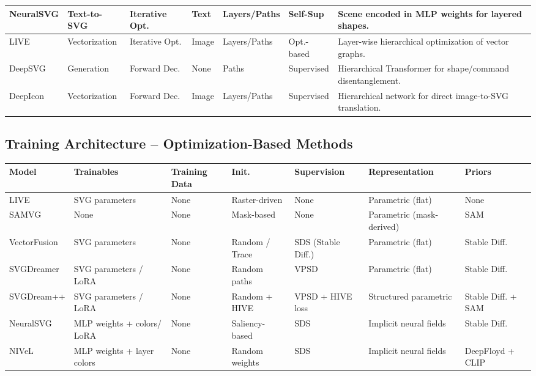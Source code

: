 \begin{landscape}
\begin{tabularx}{\linewidth}{l | l | l | l | l | l | X}
        NeuralSVG & Text-to-SVG & Iterative Opt. & Text & Layers/Paths & Self-Sup & Scene encoded in MLP weights for layered shapes. \\ \hline
        LIVE & Vectorization & Iterative Opt. & Image & Layers/Paths & Opt.-based & Layer-wise hierarchical optimization of vector graphs. \\ \hline
        DeepSVG & Generation & Forward Dec. & None & Paths & Supervised & Hierarchical Transformer for shape/command disentanglement. \\ \hline
        DeepIcon & Vectorization & Forward Dec. & Image & Layers/Paths & Supervised & Hierarchical network for direct image-to-SVG translation. \\ \hline
        \bottomrule
    \end{tabularx}
    \vfill\null
    \end{landscape}






\begin{landscape}
\thispagestyle{empty}
\centering
\small
\section*{Training Architecture – Optimization-Based Methods}

\begin{tabularx}{\linewidth}{
>{\raggedright\arraybackslash}p{2.3cm} |
>{\raggedright\arraybackslash}p{3cm} |
>{\raggedright\arraybackslash}p{2.2cm} |
>{\raggedright\arraybackslash}p{2cm} |
>{\raggedright\arraybackslash}p{2.5cm} |
>{\raggedright\arraybackslash}p{2.8cm} |
X}
\toprule
\textbf{Model} & \textbf{Trainables} & \textbf{Training Data} & \textbf{Init.} & \textbf{Supervision} & \textbf{Representation} & \textbf{Priors} \\
\midrule
LIVE & SVG parameters & None & Raster-driven & None & Parametric (flat) & None \\ \hline
SAMVG & None & None & Mask-based & None & Parametric (mask-derived) & SAM \\ \hline
VectorFusion & SVG parameters & None & Random / Trace & SDS (Stable Diff.) & Parametric (flat) & Stable Diff. \\ \hline
SVGDreamer & SVG parameters / LoRA & None & Random paths & VPSD & Parametric (flat) & Stable Diff. \\ \hline
SVGDream++ & SVG parameters / LoRA & None & Random + HIVE & VPSD + HIVE loss & Structured parametric & Stable Diff. + SAM \\ \hline
NeuralSVG & MLP weights + colors/ LoRA & None & Saliency-based & SDS & Implicit neural fields & Stable Diff. \\ \hline
NIVeL & MLP weights + layer colors & None & Random weights & SDS & Implicit neural fields & DeepFloyd + CLIP \\
\bottomrule
\end{tabularx}
\end{landscape}



